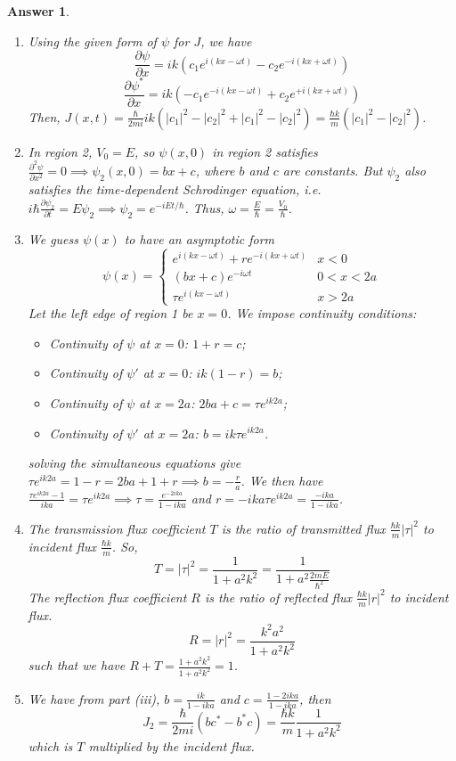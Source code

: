 \documentclass[a4paper]{article}
\newtheorem{ans}{Answer}[subsection]
\theoremstyle{new}
\begin{document}
\begin{ans}\leavevmode
\begin{enumerate}[label=(\roman*)]
\item Using the given form of $\psi$ for $J$, we have
$$\frac{\partial\psi}{\partial x}=ik(c_1e^{i(kx-\omega t)}-c_2e^{-i(kx+\omega t)})$$
$$\frac{\partial\psi^*}{\partial x}=ik(-c_1e^{-i(kx-\omega t)}+c_2e^{+i(kx+\omega t)})$$
Then, $J(x,t)=\frac{\hbar}{2mi}ik(|c_1|^2-|c_2|^2+|c_1|^2-|c_2|^2)=\frac{\hbar k}{m}(|c_1|^2-|c_2|^2)$.
\item In region 2, $V_0=E$, so $\psi(x,0)$ in region 2 satisfies $\frac{\partial^2\psi}{\partial x^2}=0\implies\psi_2(x,0)=bx+c$, where $b$ and $c$ are constants. But $\psi_2$ also satisfies the time-dependent Schrodinger equation, i.e. $i\hbar\frac{\partial\psi_2}{\partial t}=E\psi_2\implies\psi_2=e^{-iEt/\hbar}$. Thus, $\omega=\frac{E}{\hbar}=\frac{V_0}{\hbar}$.
\item We guess $\psi(x)$ to have an asymptotic form
$$\psi(x)=
\left\{
        \begin{array}{ll}
      e^{i(kx-\omega t)}+re^{-i(kx+\omega t)} & x<0\\
      (bx+c)e^{-i\omega t} & 0<x<2a\\
      \tau e^{i(kx-\omega t)} & x>2a
        \end{array}
    \right.$$ 
Let the left edge of region 1 be $x=0$. We impose continuity conditions:
\begin{itemize}
    \item Continuity of $\psi$ at $x=0$: $1+r=c$;
    \item Continuity of $\psi'$ at $x=0$: $ik(1-r)=b$;
    \item Continuity of $\psi$ at $x=2a$: $2ba+c=\tau e^{ik2a}$;
    \item Continuity of $\psi'$ at $x=2a$: $b=ik\tau e^{ik2a}$.
\end{itemize}
solving the simultaneous equations give $\tau e^{ik2a}=1-r=2ba+1+r\implies b=-\frac{r}{a}$. We then have $\frac{\tau e^{ik2a}-1}{ika}=\tau e^{ik2a}\implies\tau =\frac{e^{-2ika}}{1-ika}$ and $r=-ika\tau e^{ik2a}=\frac{-ika}{1-ika}$.
\item The transmission flux coefficient $T$ is the ratio of transmitted flux $\frac{\hbar k}{m}|\tau|^2$ to incident flux $\frac{\hbar k}{m}$. So,
$$T=|\tau|^2=\frac{1}{1+a^2k^2}=\frac{1}{1+a^2\frac{2mE}{\hbar^2}}$$
The reflection flux coefficient $R$ is the ratio of reflected flux $\frac{\hbar k}{m}|r|^2$ to incident flux.
$$R=|r|^2=\frac{k^2a^2}{1+a^2k^2}$$
such that we have $R+T=\frac{1+a^2k^2}{1+a^2k^2}=1$.
\item We have from part (iii), $b=\frac{ik}{1-ika}$ and $c=\frac{1-2ika}{1-ika}$, then
$$J_2=\frac{\hbar}{2mi}(bc^*-b^*c)=\frac{\hbar k}{m}\frac{1}{1+a^2k^2}$$
which is $T$ multiplied by the incident flux.
\end{enumerate}
\end{ans}
\end{document}
